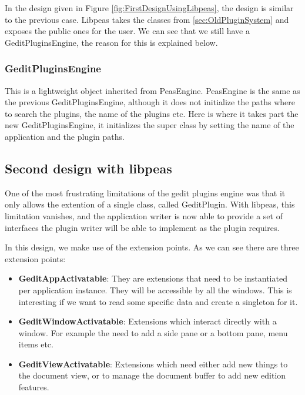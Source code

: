 
In the design given in Figure \ref{fig:FirstDesignUsingLibpeas}, the design is similar to the previous case. Libpeas 
takes the classes from \ref{sec:OldPluginSystem} and exposes the public ones for the user. We can see that we 
still have a GeditPluginsEngine, the reason for this is explained below.

\subsubsection{GeditPluginsEngine}

This is a lightweight object inherited from PeasEngine. PeasEngine is the same as the previous GeditPluginsEngine, although it does not 
initialize the paths where to search the plugins, the name of the plugins etc. Here is where it takes part the new GeditPluginsEngine, 
it initializes the super class by setting the name of the application and the plugin paths.

\subsection{Second design with libpeas}


One of the most frustrating limitations of the gedit plugins engine was that it only allows 
the extention of a single class, called GeditPlugin. With libpeas, this limitation vanishes, 
and the application writer is now able to provide a set of interfaces the plugin writer will be able to implement as the plugin requires.

In this design, we make use of the extension points. As we can see there are three extension points:
\begin{itemize}
  \item \textbf{GeditAppActivatable}: They are extensions that need to be instantiated per application instance. They will be accessible by all the windows. This is interesting if we want to read some specific data and create a singleton for it.
  \item \textbf{GeditWindowActivatable}: Extensions which interact directly with a window. For example the need to add a side pane or a bottom pane, menu items etc.
  \item \textbf{GeditViewActivatable}: Extensions which need either add new things to the document view, or to manage the document buffer to add new edition features.
\end{itemize}

